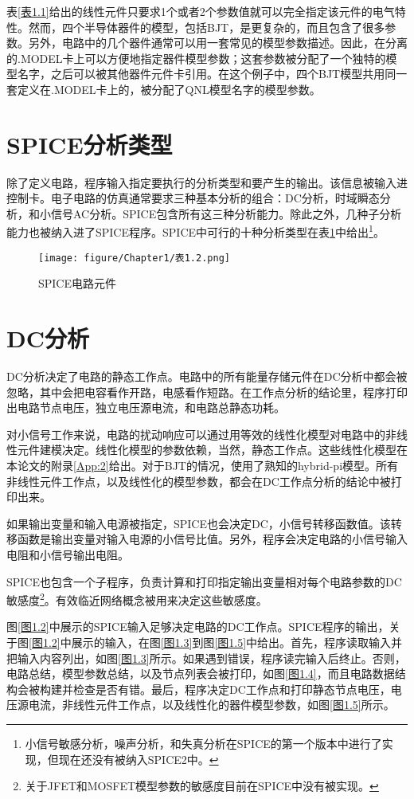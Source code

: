 表\ref{表1.1}给出的线性元件只要求1个或者2个参数值就可以完全指定该元件的电气特性。然而，四个半导体器件的模型，包括BJT，是更复杂的，而且包含了很多参数。另外，电路中的几个器件通常可以用一套常见的模型参数描述。因此，在分离的.MODEL卡上可以方便地指定器件模型参数；这套参数被分配了一个独特的模型名字，之后可以被其他器件元件卡引用。在这个例子中，四个BJT模型共用同一套定义在.MODEL卡上的，被分配了QNL模型名字的模型参数。

\section{SPICE分析类型}
除了定义电路，程序输入指定要执行的分析类型和要产生的输出。该信息被输入进控制卡。电子电路的仿真通常要求三种基本分析的组合：DC分析，时域瞬态分析，和小信号AC分析。SPICE包含所有这三种分析能力。除此之外，几种子分析能力也被纳入进了SPICE程序。SPICE中可行的十种分析类型在表\ref{表1.2}中给出\footnote{小信号敏感分析，噪声分析，和失真分析在SPICE的第一个版本中进行了实现，但现在还没有被纳入SPICE2中。}。
\begin{figure}[htbp]
\small
    \centering
    \texttt{[image: figure/Chapter1/表1.2.png]}
    \caption{SPICE电路元件}
    \label{表1.2}
\end{figure}

\section{DC分析}
DC分析决定了电路的静态工作点。电路中的所有能量存储元件在DC分析中都会被忽略，其中会把电容看作开路，电感看作短路。在工作点分析的结论里，程序打印出电路节点电压，独立电压源电流，和电路总静态功耗。

对小信号工作来说，电路的扰动响应可以通过用等效的线性化模型对电路中的非线性元件建模决定。线性化模型的参数依赖，当然，静态工作点。这些线性化模型在本论文的附录\ref{App:2}给出。对于BJT的情况，使用了熟知的hybrid-pi模型\cite{ref-4}。所有非线性元件工作点，以及线性化的模型参数，都会在DC工作点分析的结论中被打印出来。

如果输出变量和输入电源被指定，SPICE也会决定DC，小信号转移函数值。该转移函数是输出变量对输入电源的小信号比值。另外，程序会决定电路的小信号输入电阻和小信号输出电阻。

SPICE也包含一个子程序，负责计算和打印指定输出变量相对每个电路参数的DC敏感度\footnote{关于JFET和MOSFET模型参数的敏感度目前在SPICE中没有被实现。}。有效临近网络概念\cite{ref-5,ref-6}被用来决定这些敏感度。

图\ref{图1.2}中展示的SPICE输入足够决定电路的DC工作点。SPICE程序的输出，关于图\ref{图1.2}中展示的输入，在图\ref{图1.3}到图\ref{图1.5}中给出。首先，程序读取输入并把输入内容列出，如图\ref{图1.3}所示。如果遇到错误，程序读完输入后终止。否则，电路总结，模型参数总结，以及节点列表会被打印，如图\ref{图1.4}，而且电路数据结构会被构建并检查是否有错。最后，程序决定DC工作点和打印静态节点电压，电压源电流，非线性元件工作点，以及线性化的器件模型参数，如图\ref{图1.5}所示。

